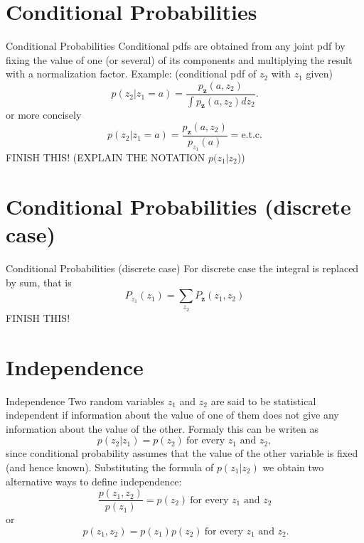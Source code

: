 \documentclass{beamer}
\begin{document}
\section{Conditional Probabilities}

\begin{frame}{Conditional Probabilities}
  Conditional pdfs are obtained from any joint pdf by fixing the value of one (or
  several) of its components and multiplying the result with a normalization
  factor. Example: (conditional pdf of $z_2$ with $z_1$ given)
  \[
  p(z_2|z_1 = a) =
  \frac{ p_{\mathbf{z}}(a, z_2)}{\int p_{\mathbf{z}}(a, z_2)dz_2}.
  \]
  or more concisely
  \[
  p(z_2|z_1 = a) =
  \frac{ p_{\mathbf{z}}(a, z_2)}{p_{z_1}(a)} = \text{e.t.c.}
  \]
  FINISH THIS! (EXPLAIN THE NOTATION $p(z_1|z_2$))
\end{frame}

\section{Conditional Probabilities (discrete case)}

\begin{frame}{Conditional Probabilities (discrete case)}
  For discrete case the integral is replaced by sum, that is
  \[
  P_{z_1}(z_1) = \sum_{z_2}P_{\mathbf{z}}(z_1, z_2)
  \]
  FINISH THIS!
\end{frame}

\section{Independence}

\begin{frame}{Independence}
  Two random variables $z_1$ and $z_2$ are said to be statistical independent if
  information about the value of one of them does not give any information about
  the value of the other. Formaly this can be writen as
  \[
  p(z_2|z_1) = p(z_2) \ \text{for every $z_1$ and $z_2$},
  \]
  since conditional probability assumes that the value of the other variable is
  fixed (and hence known). Substituting the formula of $p(z_1|z_2)$ we obtain
  two alternative ways to define independence:
  \[
  \frac{p(z_1, z_2)}{p(z_1)} = p(z_2)  \ \text{for every $z_1$ and $z_2$}
  \]
  or
  \[
  \ p(z_1, z_2) = p(z_1)p(z_2)  \ \text{for every $z_1$ and $z_2$}.
  \]
\end{frame}
\end{document}
